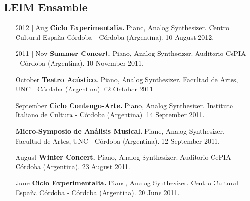 \documentclass[12pt,overlapped]{res}%
\begin{document}
\begin{resume}
\subsection{LEIM Ensamble}%
\fullline%
\begin{itemize}[align=parleft,leftmargin=2.25cm,labelwidth=2cm]
\item[2012 | Aug]
\textbf{Ciclo Experimentalia.}
Piano, Analog Synthesizer. 
Centro Cultural España Córdoba {-} Córdoba (Argentina). 
10 August 2012.
\end{itemize}%
\begin{itemize}[align=parleft,leftmargin=2.25cm,labelwidth=2cm]
\item[2011 | Nov]
\textbf{Summer Concert.}
Piano, Analog Synthesizer. 
Auditorio CePIA {-} Córdoba (Argentina). 
10 November 2011.
\end{itemize}%
\begin{itemize}[align=parleft,leftmargin=2.25cm,labelwidth=2cm]
\item[October]
\textbf{Teatro Acústico.}
Piano, Analog Synthesizer. 
Facultad de Artes, UNC {-} Córdoba (Argentina). 
02 October 2011.
\end{itemize}%
\begin{itemize}[align=parleft,leftmargin=2.25cm,labelwidth=2cm]
\item[September]
\textbf{Ciclo Contengo{-}Arte.}
Piano, Analog Synthesizer. 
Instituto Italiano de Cultura {-} Córdoba (Argentina). 
14 September 2011.
\end{itemize}%
\begin{itemize}[align=parleft,leftmargin=2.25cm,labelwidth=2cm]
\item[]
\textbf{Micro{-}Symposio de Análisis Musical.}
Piano, Analog Synthesizer. 
Facultad de Artes, UNC {-} Córdoba (Argentina). 
12 September 2011.
\end{itemize}%
\begin{itemize}[align=parleft,leftmargin=2.25cm,labelwidth=2cm]
\item[August]
\textbf{Winter Concert.}
Piano, Analog Synthesizer. 
Auditorio CePIA {-} Córdoba (Argentina). 
23 August 2011.
\end{itemize}%
\begin{itemize}[align=parleft,leftmargin=2.25cm,labelwidth=2cm]
\item[June]
\textbf{Ciclo Experimentalia.}
Piano, Analog Synthesizer. 
Centro Cultural España Córdoba {-} Córdoba (Argentina). 
20 June 2011.
\end{itemize}%
\begin{itemize}[align=parleft,leftmargin=2.25cm,labelwidth=2cm]

\end{itemize}
\end{resume}
\end{document}
